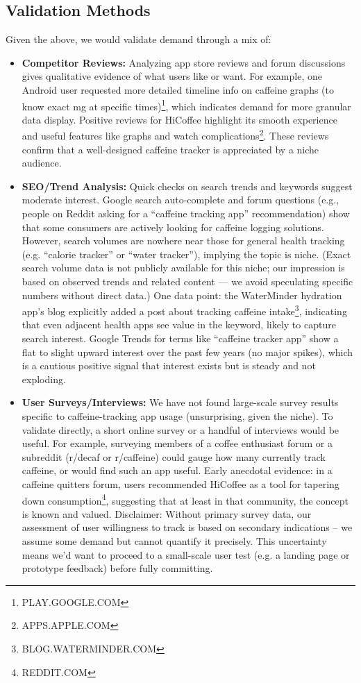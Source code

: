 \documentclass{article}
\begin{document}
\setcounter{footnote}{0} %

\subsection{Validation Methods}
Given the above, we would validate demand through a mix of:

\begin{itemize}
    \item \textbf{Competitor Reviews:} Analyzing app store reviews and forum discussions gives qualitative evidence of what users like or want. For example, one Android user requested more detailed timeline info on caffeine graphs (to know exact mg at specific times)\footnote{PLAY.GOOGLE.COM}, which indicates demand for more granular data display. Positive reviews for HiCoffee highlight its smooth experience and useful features like graphs and watch complications\footnote{APPS.APPLE.COM}. These reviews confirm that a well-designed caffeine tracker is appreciated by a niche audience.
    \item \textbf{SEO/Trend Analysis:} Quick checks on search trends and keywords suggest moderate interest. Google search auto-complete and forum questions (e.g., people on Reddit asking for a “caffeine tracking app” recommendation) show that some consumers are actively looking for caffeine logging solutions. However, search volumes are nowhere near those for general health tracking (e.g. “calorie tracker” or “water tracker”), implying the topic is niche. (Exact search volume data is not publicly available for this niche; our impression is based on observed trends and related content — we avoid speculating specific numbers without direct data.) One data point: the WaterMinder hydration app’s blog explicitly added a post about tracking caffeine intake\footnote{BLOG.WATERMINDER.COM}, indicating that even adjacent health apps see value in the keyword, likely to capture search interest. Google Trends for terms like “caffeine tracker app” show a flat to slight upward interest over the past few years (no major spikes), which is a cautious positive signal that interest exists but is steady and not exploding.
    \item \textbf{User Surveys/Interviews:} We have not found large-scale survey results specific to caffeine-tracking app usage (unsurprising, given the niche). To validate directly, a short online survey or a handful of interviews would be useful. For example, surveying members of a coffee enthusiast forum or a subreddit (r/decaf or r/caffeine) could gauge how many currently track caffeine, or would find such an app useful. Early anecdotal evidence: in a caffeine quitters forum, users recommended HiCoffee as a tool for tapering down consumption\footnote{REDDIT.COM}, suggesting that at least in that community, the concept is known and valued. Disclaimer: Without primary survey data, our assessment of user willingness to track is based on secondary indications – we assume some demand but cannot quantify it precisely. This uncertainty means we’d want to proceed to a small-scale user test (e.g. a landing page or prototype feedback) before fully committing.
\end{itemize}
\end{document}
